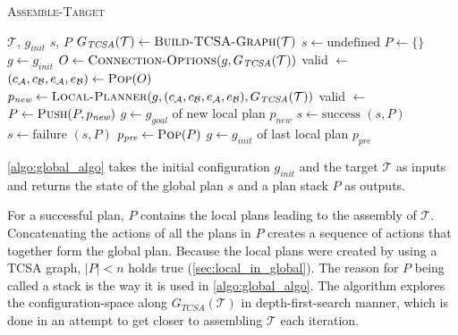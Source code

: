 \begin{algorithm}
	\caption{\scshape Assemble-Target}
	\label{algo:global_algo}
	\begin{algorithmic}[1]
		\REQUIRE $\mathcal{T}$, $g_\textit{init}$ 
		\ENSURE $s$, $P$ 
		\STATE $G_{\textit{TCSA}}(\mathcal{T}) \gets \text{\scshape Build-TCSA-Graph}(\mathcal{T})$
		\STATE $s \gets \text{undefined}$
		\STATE $P \gets \{\}$ 
		\STATE $g \gets g_\textit{init}$ 
		\LOOP
			\STATE $O \gets \text{\scshape Connection-Options}(g, G_{\textit{TCSA}}(\mathcal{T}))$
			\STATE valid $\gets$ \FALSE
				\STATE $(c_\mathcal{A}, c_\mathcal{B}, e_\mathcal{A}, e_\mathcal{B}) \gets \text{\scshape Pop}(O)$
				\STATE $p_\textit{new} \gets \text{\scshape Local-Planner}(g, (c_\mathcal{A}, c_\mathcal{B}, e_\mathcal{A}, e_\mathcal{B}), G_{\textit{TCSA}}(\mathcal{T}))$
					\STATE valid $\gets$ \TRUE
				\ENDIF
			\ENDWHILE
				\STATE $P \gets \text{\scshape Push}(P, p_\textit{new})$ 
				\STATE $g \gets g_\textit{goal}$ of new local plan $p_\textit{new}$ 
					\STATE $s \gets \text{success}$
					\RETURN $(s, P)$
				\ENDIF
			\ELSE
					\STATE $s \gets \text{failure}$
					\RETURN $(s, P)$
				\ENDIF
				\STATE $p_\textit{pre} \gets \text{\scshape Pop}(P)$ 
				\STATE $g \gets g_\textit{init}$ of last local plan $p_\textit{pre}$ 
			\ENDIF
		\ENDLOOP
	\end{algorithmic}
\end{algorithm}

\autoref{algo:global_algo} takes the initial configuration $g_\textit{init}$ and the target $\mathcal{T}$ as inputs and returns the state of the global plan $s$ and a plan stack $P$ as outputs.

For a successful plan, $P$ contains the local plans leading to the assembly of $\mathcal{T}$.
Concatenating the actions of all the plans in $P$ creates a sequence of actions that together form the global plan.
Because the local plans were created by using a TCSA graph, $|P| < n$ holds true (\autoref{sec:local_in_global}).
The reason for $P$ being called a stack is the way it is used in \autoref{algo:global_algo}.
The algorithm explores the configuration-space along $G_{\textit{TCSA}}(\mathcal{T})$ in depth-first-search manner, which is done in an attempt to get closer to assembling $\mathcal{T}$ each iteration.

